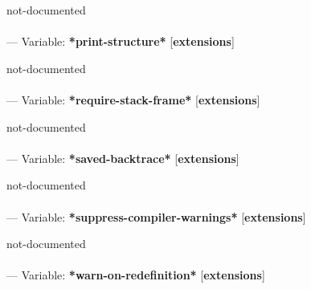 \begin{adjustwidth}{5em}{5em}
not-documented
\end{adjustwidth}

\paragraph{}
\label{EXTENSIONS:*PRINT-STRUCTURE*}
--- Variable: \textbf{*print-structure*} [\textbf{extensions}] \textit{}

\begin{adjustwidth}{5em}{5em}
not-documented
\end{adjustwidth}

\paragraph{}
\label{EXTENSIONS:*REQUIRE-STACK-FRAME*}
--- Variable: \textbf{*require-stack-frame*} [\textbf{extensions}] \textit{}

\begin{adjustwidth}{5em}{5em}
not-documented
\end{adjustwidth}

\paragraph{}
\label{EXTENSIONS:*SAVED-BACKTRACE*}
--- Variable: \textbf{*saved-backtrace*} [\textbf{extensions}] \textit{}

\begin{adjustwidth}{5em}{5em}
not-documented
\end{adjustwidth}

\paragraph{}
\label{EXTENSIONS:*SUPPRESS-COMPILER-WARNINGS*}
--- Variable: \textbf{*suppress-compiler-warnings*} [\textbf{extensions}] \textit{}

\begin{adjustwidth}{5em}{5em}
not-documented
\end{adjustwidth}

\paragraph{}
\label{EXTENSIONS:*WARN-ON-REDEFINITION*}
--- Variable: \textbf{*warn-on-redefinition*} [\textbf{extensions}] \textit{}

